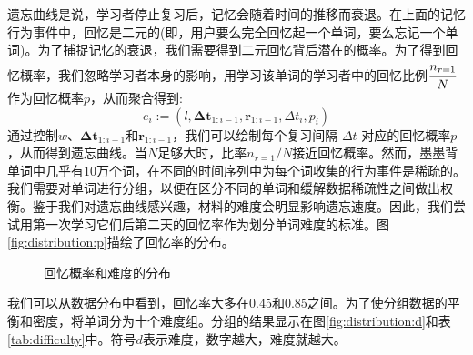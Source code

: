 遗忘曲线是说，学习者停止复习后，记忆会随着时间的推移而衰退。在上面的记忆行为事件中，回忆是二元的(即，用户要么完全回忆起一个单词，要么忘记一个单词)。为了捕捉记忆的衰退，我们需要得到二元回忆背后潜在的概率。为了得到回忆概率，我们忽略学习者本身的影响，用学习该单词的学习者中的回忆比例$\cfrac{n_{r=1}}{N}$作为回忆概率$p$，从而聚合得到:
\begin{equation}
e_{i} :=(l, \boldsymbol{\Delta t}_{1:i-1}, \boldsymbol r_{1:i-1}, \Delta t_i , p_i)
\end{equation}
通过控制$w$、$\boldsymbol{\Delta t}_{1:i-1}$和$\boldsymbol r_{1:i-1}$，我们可以绘制每个复习间隔 $\Delta t$ 对应的回忆概率$p$，从而得到遗忘曲线。当$N$足够大时，比率$n_{r=1}/N$接近回忆概率。然而，墨墨背单词中几乎有10万个词，在不同的时间序列中为每个词收集的行为事件是稀疏的。我们需要对单词进行分组，以便在区分不同的单词和缓解数据稀疏性之间做出权衡。鉴于我们对遗忘曲线感兴趣，材料的难度会明显影响遗忘速度。因此，我们尝试用第一次学习它们后第二天的回忆率作为划分单词难度的标准。图\ref{fig:distribution:p}描绘了回忆率的分布。

\begin{figure}[htbp]
    \setlength{\subfigcapskip}{-1bp}
    \centering
    \begin{minipage}{\textwidth}
    \centering
    \subfigure{\label{fig:distribution:p}}\addtocounter{subfigure}{-2}
    \hspace{2em}
    \subfigure{\label{fig:distribution:d}}\addtocounter{subfigure}{-2}
    \end{minipage}
    \caption{回忆概率和难度的分布}
    \label{fig:distribution}
\end{figure}

我们可以从数据分布中看到，回忆率大多在0.45和0.85之间。为了使分组数据的平衡和密度，将单词分为十个难度组。分组的结果显示在图\ref{fig:distribution:d}和表\ref{tab:difficulty}中。符号$d$表示难度，数字越大，难度就越大。

